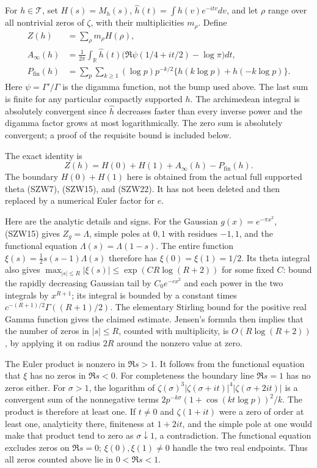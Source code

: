 \documentclass[
  10pt,
  a4paper,
]{article}
\begin{document}
For \(h\in\mathcal T\), set \(H(s)=M_h(s)\),
\(\widehat h(t)=\int h(v)e^{-itv}dv\), and let \(\rho\) range over all
nontrivial zeros of \(\zeta\), with their multiplicities \(m_\rho\).
Define \[
\begin{aligned}
Z(h)&=\sum_\rho m_\rho H(\rho),\\
A_\infty(h)&=\frac1{2\pi}\int_{\mathbb R}\widehat h(t)
\bigl(\Re\psi(1/4+it/2)-\log\pi\bigr)dt,\\
P_{\mathrm{fin}}(h)&=\sum_{p}\sum_{k\ge1}
(\log p)p^{-k/2}\{h(k\log p)+h(-k\log p)\}.
\end{aligned}
\tag{SZW24}
\] Here \(\psi=\Gamma'/\Gamma\) is the digamma function, not the bump
used above. The last sum is finite for any particular compactly
supported \(h\). The archimedean integral is absolutely convergent since
\(\widehat h\) decreases faster than every inverse power and the digamma
factor grows at most logarithmically. The zero sum is absolutely
convergent; a proof of the requisite bound is included below.

The exact identity is \[
\boxed{Z(h)=H(0)+H(1)+A_\infty(h)-P_{\mathrm{fin}}(h).}
\tag{SZW25}
\] The boundary \(H(0)+H(1)\) here is obtained from the actual full
supported theta (SZW7), (SZW15), and (SZW22). It has not been deleted
and then replaced by a numerical Euler factor for \(e\).

Here are the analytic details and signs. For the Gaussian
\(g(x)=e^{-\pi x^2}\), (SZW15) gives \(Z_g=\Lambda\), simple poles at
\(0,1\) with residues \(-1,1\), and the functional equation
\(\Lambda(s)=\Lambda(1-s)\). The entire function
\(\xi(s)=\tfrac12s(s-1)\Lambda(s)\) therefore has \(\xi(0)=\xi(1)=1/2\).
Its theta integral also gives
\(\max_{|s|\le R}|\xi(s)|\le\exp(CR\log(R+2))\) for some fixed \(C\):
bound the rapidly decreasing Gaussian tail by \(C_0e^{-c x^2}\) and each
power in the two integrals by \(x^{R+1}\); its integral is bounded by a
constant times \(c^{-(R+1)/2}\Gamma((R+1)/2)\). The elementary Stirling
bound for the positive real Gamma function gives the claimed estimate.
Jensen's formula then implies that the number of zeros in \(|s|\le R\),
counted with multiplicity, is \(O(R\log(R+2))\), by applying it on
radius \(2R\) around the nonzero value at zero.

The Euler product is nonzero in \(\Re s>1\). It follows from the
functional equation that \(\xi\) has no zeros in \(\Re s<0\). For
completeness the boundary line \(\Re s=1\) has no zeros either. For
\(\sigma>1\), the logarithm of
\(\zeta(\sigma)^3|\zeta(\sigma+it)|^4|\zeta(\sigma+2it)|\) is a
convergent sum of the nonnegative terms
\(2p^{-k\sigma}(1+\cos(kt\log p))^2/k\). The product is therefore at
least one. If \(t\ne0\) and \(\zeta(1+it)\) were a zero of order at
least one, analyticity there, finiteness at \(1+2it\), and the simple
pole at one would make that product tend to zero as
\(\sigma\downarrow1\), a contradiction. The functional equation excludes
zeros on \(\Re s=0\); \(\xi(0),\xi(1)\ne0\) handle the two real
endpoints. Thus all zeros counted above lie in \(0<\Re s<1\).
\end{document}

